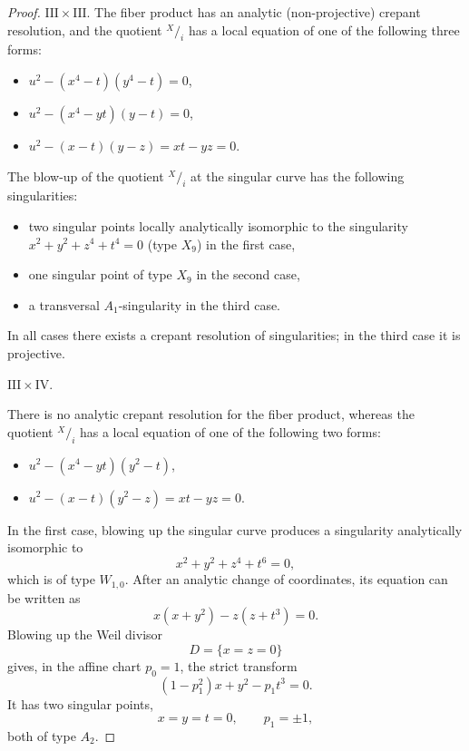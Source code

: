 \documentclass[a4paper]{amsart}
\theoremstyle{plain}
\theoremstyle{definition}
\theoremstyle{remark}
\numberwithin{equation}{section}
\newcommand*\quot[2]{{^{\textstyle #1}\big/_{\textstyle #2}}}
\begin{document}
\begin{proof}
\vspace{2mm}
\medskip
\noindent\emph{$\mathrm{III} \times \mathrm{III}$}.
The fiber product has an analytic (non-projective) crepant resolution, and the quotient $\quot{X}{i}$ has a local equation of one of the following three forms:
\def\labelwidth{5cm}
\begin{itemize}\def\itemindent{15mm}
	\item [$\mathrm{III}^{a}\times \mathrm{III}^{a}$:] $u^{2}-(x^{4}-t)(y^{4}-t)=0$,
	\item [$\mathrm{III}^{a}\times \mathrm{III}^{b}$:] $u^2 - (x^4-yt)(y-t)=0$,
	\item [$\mathrm{III}^{b}\times \mathrm{III}^{b}$:] $u^2-(x-t)(y-z) = xt-yz=0.$
\end{itemize}
The blow-up of the quotient $\quot{X}{i}$ at the singular curve has the following singularities:
\begin{itemize}
	\item two singular points locally analytically isomorphic to the singularity $x^{2}+y^{2}+z^{4}+t^{4}=0$ (type $X_{9}$) in the first case,
	\item one singular point of type $X_{9}$ in the second case,
	\item a transversal $A_{1}$-singularity in the third case.
\end{itemize}
In all cases there exists a crepant resolution of singularities; in the third case it is projective.
\vspace{2mm}

\medskip
\noindent\emph{$\mathrm{III} \times \mathrm{IV}$}.


There is no analytic crepant resolution for the fiber product,
whereas the quotient $\quot{X}{i}$
has a local equation of one of the following two forms:
\def\labelwidth{5cm}
\begin{itemize}\def\itemindent{15mm}
	\item [$\mathrm{III}^{a}\times \mathrm{IV}^{}$:] $u^{2}-(x^{4}-yt)(y^{2}-t)$,
	\item [$\mathrm{III}^{b}\times \mathrm{IV}^{}$:] $u^{2}-(x-t)(y^{2}-z) = xt-yz =0$.
\end{itemize}
In the first case, blowing up the singular curve produces a singularity
analytically isomorphic to
\[
x^{2}+y^{2}+z^{4}+t^{6}=0,
\]
which is of type $W_{1,0}$. After an analytic change of coordinates, its
equation can be written as
\[
x(x+y^{2})-z(z+t^{3})=0.
\]
Blowing up the Weil divisor
\[
D=\{x=z=0\}
\]
gives, in the affine chart $p_{0}=1$, the strict transform
\[
(1-p_{1}^{2})x+y^{2}-p_{1}t^{3}=0.
\]
It has two singular points,
\[
x=y=t=0,\qquad p_{1}=\pm1,
\]
both of type $A_{2}$.


\end{proof}
\end{document}
